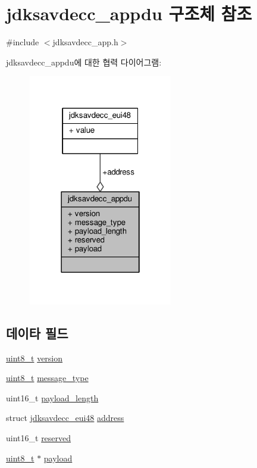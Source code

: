 \hypertarget{structjdksavdecc__appdu}{}\section{jdksavdecc\+\_\+appdu 구조체 참조}
\label{structjdksavdecc__appdu}


{\ttfamily \#include $<$jdksavdecc\+\_\+app.\+h$>$}



jdksavdecc\+\_\+appdu에 대한 협력 다이어그램\+:
\nopagebreak
\begin{figure}[H]
\begin{center}
\leavevmode
\includegraphics[width=178pt]{structjdksavdecc__appdu__coll__graph}
\end{center}
\end{figure}
\subsection*{데이타 필드}
\begin{DoxyCompactItemize}
\item 
\hyperlink{stdint_8h_aba7bc1797add20fe3efdf37ced1182c5}{uint8\+\_\+t} \hyperlink{structjdksavdecc__appdu_ab22abc2906422da61885ac6c8e6a1a59}{version}
\item 
\hyperlink{stdint_8h_aba7bc1797add20fe3efdf37ced1182c5}{uint8\+\_\+t} \hyperlink{structjdksavdecc__appdu_aeaaffeace8c23899e558022f62ce6de4}{message\+\_\+type}
\item 
uint16\+\_\+t \hyperlink{structjdksavdecc__appdu_a35753b38429185bc9a6e6f711925d6f1}{payload\+\_\+length}
\item 
struct \hyperlink{structjdksavdecc__eui48}{jdksavdecc\+\_\+eui48} \hyperlink{structjdksavdecc__appdu_a58564d10e6bb944368888630d011b003}{address}
\item 
uint16\+\_\+t \hyperlink{structjdksavdecc__appdu_a5a6ed8c04a3db86066924b1a1bf4dad3}{reserved}
\item 
\hyperlink{stdint_8h_aba7bc1797add20fe3efdf37ced1182c5}{uint8\+\_\+t} $\ast$ \hyperlink{structjdksavdecc__appdu_aa5cbdad2c57e9b3f949e1a4d96382b66}{payload}
\end{DoxyCompactItemize}


